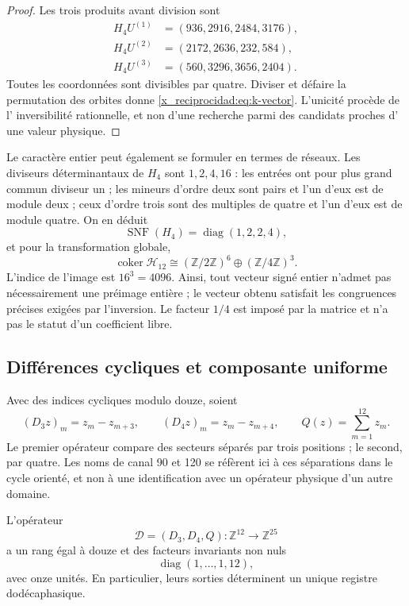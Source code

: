 \begin{proof}
Les trois produits avant division sont
\begin{align*}
 H_4U^{(1)}&=(936,2916,2484,3176),\\
 H_4U^{(2)}&=(2172,2636,232,584),\\
 H_4U^{(3)}&=(560,3296,3656,2404).
\end{align*}
Toutes les coordonnées sont divisibles par quatre. Diviser et défaire la
permutation des orbites donne \eqref{x_reciprocidad:eq:k-vector}. L'unicité procède de l'
inversibilité rationnelle, et non d'une recherche parmi des candidats proches d'
une valeur physique.
\end{proof}

Le caractère entier peut également se formuler en termes de réseaux. Les diviseurs déterminantaux de \(H_4\) sont \(1,2,4,16\) : les entrées ont pour plus grand commun diviseur un ; les mineurs d'ordre deux sont pairs et l'un d'eux est de module deux ; ceux d'ordre trois sont des multiples de quatre et l'un d'eux est de module quatre. On en déduit
\[
 \operatorname{SNF}(H_4)=\operatorname{diag}(1,2,2,4),
\]
et pour la transformation globale,
\[
 \operatorname{coker}\mathcal H_{12}
 \cong(\mathbb Z/2\mathbb Z)^6\oplus(\mathbb Z/4\mathbb Z)^3.
\]
L'indice de l'image est \(16^3=4096\). Ainsi, tout vecteur signé
entier n'admet pas nécessairement une préimage entière ; le vecteur obtenu satisfait les
congruences précises exigées par l'inversion. Le facteur \(1/4\) est
imposé par la matrice et n'a pas le statut d'un coefficient libre.

\subsection{Différences cycliques et composante uniforme}
\label{x_reciprocidad:subsec:k-transversal}

Avec des indices cycliques modulo douze, soient
\[
 (D_3z)_m=z_m-z_{m+3},\qquad(D_4z)_m=z_m-z_{m+4},
 \qquad Q(z)=\sum_{m=1}^{12}z_m.
\]
Le premier opérateur compare des secteurs séparés par trois positions ; le
second, par quatre. Les noms de canal 90 et 120 se réfèrent ici à
ces séparations dans le cycle orienté, et non à une identification avec un
opérateur physique d'un autre domaine.

\begin{proposition}
\label{x_reciprocidad:prop:k-transversal}
L'opérateur
\[
 \mathcal D=(D_3,D_4,Q):\mathbb Z^{12}\longrightarrow\mathbb Z^{25}
\]
a un rang égal à douze et des facteurs invariants non nuls
\[
 \operatorname{diag}(1,\ldots,1,12),
\]
avec onze unités. En particulier, leurs sorties déterminent un unique registre dodécaphasique.
\end{proposition}

